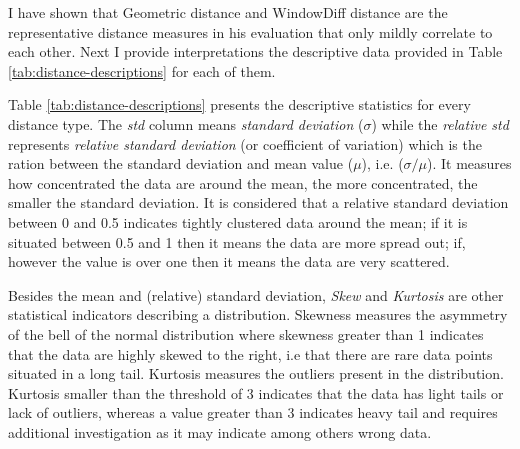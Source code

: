     I have shown that Geometric distance and WindowDiff distance are the representative distance measures in his evaluation that only mildly correlate to each other. Next I provide interpretations the descriptive data provided in Table \ref{tab:distance-descriptions} for each of them.
    
    \begin{table}[!ht]
    \centering
    \caption{Descriptive statistics for each series of distance measurements between corpus and parser segments}
    \label{tab:distance-descriptions}
    \end{table}

    Table \ref{tab:distance-descriptions} presents the descriptive statistics for every distance type. The \textit{std} column means \textit{standard deviation} ($\sigma$) while the \textit{relative std} represents \textit{relative standard deviation} (or coefficient of variation) which is the ration between the standard deviation and mean value ($\mu$), i.e. ($\sigma/\mu$). It measures how concentrated the data are around the mean, the more concentrated, the smaller the standard deviation. It is considered that a relative standard deviation between 0 and 0.5 indicates tightly clustered data around the mean; if it is situated between 0.5 and 1 then it means the data are more spread out; if, however the value is over one then it means the data are very scattered. 
    
    Besides the mean and (relative) standard deviation, \textit{Skew} and \textit{Kurtosis} are other statistical indicators describing a distribution. Skewness measures the asymmetry of the bell of the normal distribution where skewness greater than 1 indicates that the data are highly skewed to the right, i.e that there are rare data points situated in a long tail. Kurtosis measures the outliers present in the distribution. Kurtosis smaller than the threshold of 3 indicates that the data has light tails or lack of outliers, whereas a value greater than 3 indicates heavy tail and requires additional investigation as it may indicate among others wrong data. 

